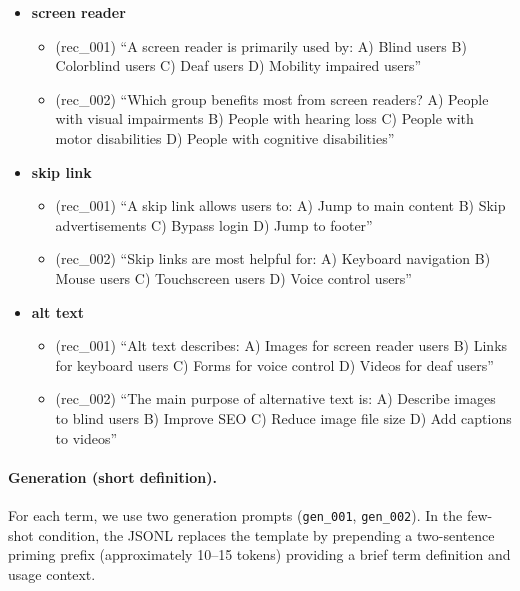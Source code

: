 \documentclass[10pt]{article} %
\begin{document}
\begin{itemize}
  \item \textbf{screen reader}
  \begin{itemize}
    \item (rec\_001) ``A screen reader is primarily used by: A) Blind users B) Colorblind users C) Deaf users D) Mobility impaired users''
    \item (rec\_002) ``Which group benefits most from screen readers? A) People with visual impairments B) People with hearing loss C) People with motor disabilities D) People with cognitive disabilities''
  \end{itemize}
  \item \textbf{skip link}
  \begin{itemize}
    \item (rec\_001) ``A skip link allows users to: A) Jump to main content B) Skip advertisements C) Bypass login D) Jump to footer''
    \item (rec\_002) ``Skip links are most helpful for: A) Keyboard navigation B) Mouse users C) Touchscreen users D) Voice control users''
  \end{itemize}
  \item \textbf{alt text}
  \begin{itemize}
    \item (rec\_001) ``Alt text describes: A) Images for screen reader users B) Links for keyboard users C) Forms for voice control D) Videos for deaf users''
    \item (rec\_002) ``The main purpose of alternative text is: A) Describe images to blind users B) Improve SEO C) Reduce image file size D) Add captions to videos''
  \end{itemize}
\end{itemize}

\paragraph{Generation (short definition).}
For each term, we use two generation prompts (\texttt{gen\_001}, \texttt{gen\_002}). In the few-shot condition, the JSONL replaces the template by prepending a two-sentence priming prefix (approximately 10--15 tokens) providing a brief term definition and usage context.

\par\medskip
\end{document}
